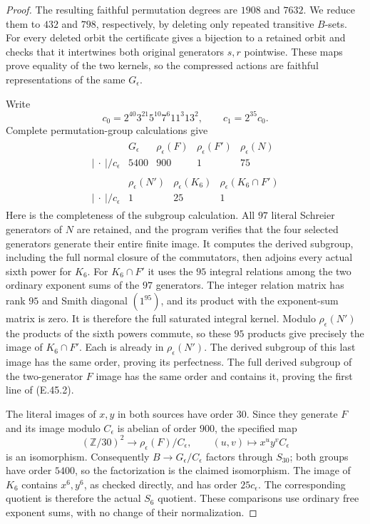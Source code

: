 \begin{proof}
The resulting faithful permutation degrees are $1908$ and $7632$.
We reduce them to $432$ and $798$, respectively, by deleting
only repeated transitive $B$-sets.  For every deleted orbit the
certificate gives a bijection to a retained orbit and checks
that it intertwines both original generators $s,r$ pointwise.
These maps prove equality of the two kernels, so the compressed
actions are faithful representations of the same $G_\epsilon$.

Write
\[
 c_0=2^{40}3^{21}5^{10}7^6 11^3 13^2,
       \qquad c_1=2^{35}c_0.
 \tag{E.45.9}
\]
Complete permutation-group calculations give
\[
\begin{gathered}
\begin{array}{c|rrrr}
 &G_\epsilon&\rho_\epsilon(F)&\rho_\epsilon(F')&\rho_\epsilon(N)\\ \hline
 |\ \cdot\ |/c_\epsilon&5400&900&1&75
\end{array}\\[4pt]
\begin{array}{c|rrr}
 &\rho_\epsilon(N')&\rho_\epsilon(K_6)&\rho_\epsilon(K_6\cap F')\\ \hline
 |\ \cdot\ |/c_\epsilon&1&25&1
\end{array}
\end{gathered}
 \tag{E.45.10}
\]
Here is the completeness of the subgroup calculation.
All $97$ literal Schreier generators of $N$ are retained,
and the program verifies that the four selected generators
generate their entire finite image.  It computes the derived
subgroup, including the full normal closure of the commutators,
then adjoins every actual sixth power for $K_6$.
For $K_6\cap F'$ it uses the $95$ integral relations among
the two ordinary exponent sums of the $97$ generators.
The integer relation matrix has rank $95$ and Smith diagonal
$(1^{95})$, and its product with the exponent-sum matrix is zero.
It is therefore the full saturated integral kernel.
Modulo $\rho_\epsilon(N')$ the products of the sixth powers
commute, so these $95$ products give precisely the image of
$K_6\cap F'$.  Each is already in $\rho_\epsilon(N')$.
The derived subgroup of this last image has the same order,
proving its perfectness.  The full derived subgroup of the
two-generator $F$ image has the same order and contains it,
proving the first line of \textup{(E.45.2)}.

The literal images of $x,y$ in both sources have order $30$.
Since they generate $F$ and its image modulo $C_\epsilon$
is abelian of order $900$, the specified map
\[
 (\mathbb Z/30)^2\longrightarrow\rho_\epsilon(F)/C_\epsilon,
                 \qquad (u,v)\longmapsto x^uy^v C_\epsilon
 \tag{E.45.11}
\]
is an isomorphism.  Consequently $B\to G_\epsilon/C_\epsilon$
factors through $S_{30}$; both groups have order $5400$, so
the factorization is the claimed isomorphism.  The image of
$K_6$ contains $x^6,y^6$, as checked directly, and has order
$25c_\epsilon$.  The corresponding quotient is therefore
the actual $S_6$ quotient.  These comparisons use ordinary
free exponent sums, with no change of their normalization.


\end{proof}
